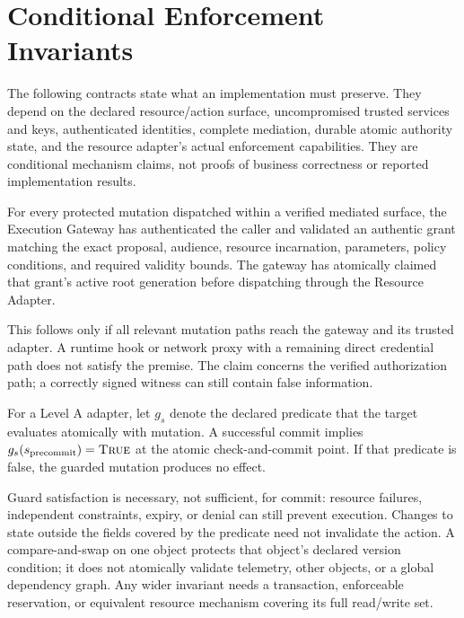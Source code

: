 \appendix
\section{Conditional Enforcement Invariants}
\label{sec:app-model}

The following contracts state what an implementation must preserve. They depend on the declared resource/action surface, uncompromised trusted services and keys, authenticated identities, complete mediation, durable atomic authority state, and the resource adapter's actual enforcement capabilities. They are conditional mechanism claims, not proofs of business correctness or reported implementation results.

\begin{proposition}
For every protected mutation dispatched within a verified mediated surface, the Execution Gateway has authenticated the caller and validated an authentic grant matching the exact proposal, audience, resource incarnation, parameters, policy conditions, and required validity bounds. The gateway has atomically claimed that grant's active root generation before dispatching through the Resource Adapter.
\end{proposition}

This follows only if all relevant mutation paths reach the gateway and its trusted adapter. A runtime hook or network proxy with a remaining direct credential path does not satisfy the premise. The claim concerns the verified authorization path; a correctly signed witness can still contain false information.

\begin{proposition}
For a Level A adapter, let $g_s$ denote the declared predicate that the target evaluates atomically with mutation. A successful commit implies $g_s(s_{\mathrm{precommit}})=\textsc{True}$ at the atomic check-and-commit point. If that predicate is false, the guarded mutation produces no effect.
\end{proposition}

Guard satisfaction is necessary, not sufficient, for commit: resource failures, independent constraints, expiry, or denial can still prevent execution. Changes to state outside the fields covered by the predicate need not invalidate the action. A compare-and-swap on one object protects that object's declared version condition; it does not atomically validate telemetry, other objects, or a global dependency graph. Any wider invariant needs a transaction, enforceable reservation, or equivalent resource mechanism covering its full read/write set.

